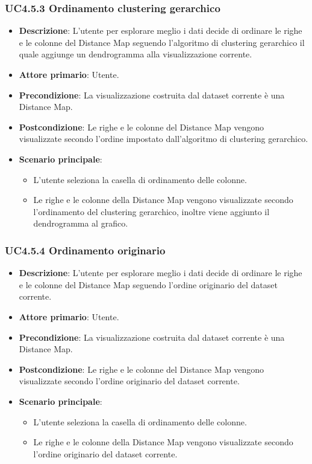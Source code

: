 \subsubsection{UC4.5.3 Ordinamento clustering gerarchico}
\label{ssub:uc4.5.3}
\begin{itemize}
    \item \textbf{Descrizione}: L'utente per esplorare meglio i dati decide di ordinare le righe e le colonne del Distance Map seguendo l'algoritmo di clustering gerarchico il quale aggiunge un dendrogramma alla visualizzazione corrente.
    \item \textbf{Attore primario}: Utente.
    \item \textbf{Precondizione}: La visualizzazione costruita dal dataset corrente è una Distance Map.
    \item \textbf{Postcondizione}: Le righe e le colonne del Distance Map vengono visualizzate secondo l'ordine impostato dall'algoritmo di clustering gerarchico.
    \item \textbf{Scenario principale}: 
    \begin{itemize}
        \item L'utente seleziona la casella di ordinamento delle colonne.
        \item Le righe e le colonne della Distance Map vengono visualizzate secondo l'ordinamento del clustering gerarchico, inoltre viene aggiunto il dendrogramma al grafico.
    \end{itemize}
\end{itemize}

\subsubsection{UC4.5.4 Ordinamento originario}
\label{ssub:uc4.5.4}
\begin{itemize}
    \item \textbf{Descrizione}: L'utente per esplorare meglio i dati decide di ordinare le righe e le colonne del Distance Map seguendo l'ordine originario del dataset corrente.
    \item \textbf{Attore primario}: Utente.
    \item \textbf{Precondizione}: La visualizzazione costruita dal dataset corrente è una Distance Map.
    \item \textbf{Postcondizione}: Le righe e le colonne del Distance Map vengono visualizzate secondo l'ordine originario del dataset corrente.
    \item \textbf{Scenario principale}: 
    \begin{itemize}
        \item L'utente seleziona la casella di ordinamento delle colonne.
        \item Le righe e le colonne della Distance Map vengono visualizzate secondo l'ordine originario del dataset corrente.
    \end{itemize}
\end{itemize}

